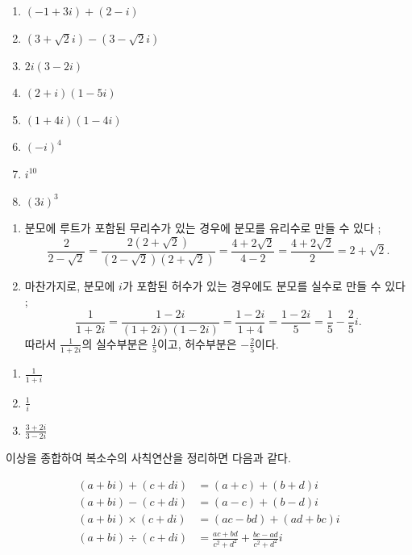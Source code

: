 \documentclass{oblivoir}
\begin{document}
%
\begin{enumerate}\label{comp8}
\item
\((-1+3i)+(2-i)\)
\item
\((3+\sqrt2i)-(3-\sqrt2i)\)
\item
\(2i(3-2i)\)
\item
\((2+i)(1-5i)\)
\item
\((1+4i)(1-4i)\)
\item
\((-i)^4\)
\item
\(i^{10}\)
\item
\((3i)^3\)
\end{enumerate}

\clearpage
%
\begin{enumerate}
\item
분모에 루트가 포함된 무리수가 있는 경우에 분모를 유리수로 만들 수 있다 ;
\[\frac{2}{2-\sqrt2}=\frac{2(2+\sqrt2)}{(2-\sqrt2)(2+\sqrt2)}=\frac{4+2\sqrt2}{4-2}=\frac{4+2\sqrt2}2=2+\sqrt2.\]
\item
마찬가지로, 분모에 \(i\)가 포함된 허수가 있는 경우에도 분모를 실수로 만들 수 있다 ;
\[\frac1{1+2i}=\frac{1-2i}{(1+2i)(1-2i)}=\frac{1-2i}{1+4}=\frac{1-2i}5=\frac15-\frac25i.\]
따라서 \(\frac1{1+2i}\)의 실수부분은 \(\frac15\)이고, 허수부분은 \(-\frac25\)이다.
\end{enumerate}

%
\begin{enumerate}\label{comp9}
\item
\(\frac1{1+i}\)
\item
\(\frac1i\)
\item
\(\frac{3+2i}{3-2i}\)
\end{enumerate}

\clearpage
이상을 종합하여 복소수의 사칙연산을 정리하면 다음과 같다.
%
\begin{mdframed}
\vspace{-20pt}
\begin{align*}
(a+bi)+(c+di)		&=(a+c)+(b+d)i\\
(a+bi)-(c+di)		&=(a-c)+(b-d)i\\
(a+bi)\times(c+di)&=(ac-bd)+(ad+bc)i\\
(a+bi)\div(c+di)	&=\frac{ac+bd}{c^2+d^2}+\frac{bc-ad}{c^2+d^2}i
\end{align*}
\end{mdframed}
\end{document}
